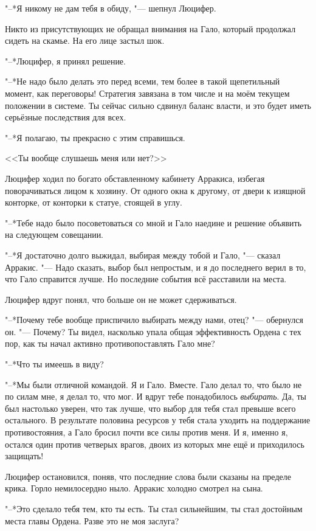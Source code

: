 "--*Я никому не дам тебя в обиду, "--- шепнул Люцифер.

Никто из присутствующих не обращал внимания на Гало, который продолжал сидеть на скамье.
На его лице застыл шок.

\razd

"--*Люцифер, я принял решение.

"--*Не надо было делать это перед всеми, тем более в такой щепетильный момент, как переговоры!
Стратегия завязана в том числе и на моём текущем положении в системе.
Ты сейчас сильно сдвинул баланс власти, и это будет иметь серьёзные последствия для всех.

"--*Я полагаю, ты прекрасно с этим справишься.

<<Ты вообще слушаешь меня или нет?>>

Люцифер ходил по богато обставленному кабинету Арракиса, избегая поворачиваться лицом к хозяину.
От одного окна к другому, от двери к изящной конторке, от конторки к статуе, стоящей в углу.

"--*Тебе надо было посоветоваться со мной и Гало наедине и решение объявить на следующем совещании.

"--*Я достаточно долго выжидал, выбирая между тобой и Гало, "--- сказал Арракис.
"--- Надо сказать, выбор был непростым, и я до последнего верил в то, что Гало справится лучше.
Но последние события всё расставили на места.

Люцифер вдруг понял, что больше он не может сдерживаться.

"--*Почему тебе вообще приспичило выбирать между нами, отец? "--- обернулся он.
"--- Почему?
Ты видел, насколько упала общая эффективность Ордена с тех пор, как ты начал активно противопоставлять Гало мне?

"--*Что ты имеешь в виду?

"--*Мы были отличной командой.
Я и Гало.
Вместе.
Гало делал то, что было не по силам мне, я делал то, что мог.
И вдруг тебе понадобилось \emph{выбирать}.
Да, ты был настолько уверен, что так лучше, что выбор для тебя стал превыше всего остального.
В результате половина ресурсов у тебя стала уходить на поддержание противостояния, а Гало бросил почти все силы против меня.
И я, именно я, остался один против четверых врагов, двоих из которых мне ещё и приходилось защищать!

Люцифер остановился, поняв, что последние слова были сказаны на пределе крика.
Горло немилосердно ныло.
Арракис холодно смотрел на сына.

"--*Это сделало тебя тем, кто ты есть.
Ты стал сильнейшим, ты стал достойным места главы Ордена.
Разве это не моя заслуга?

